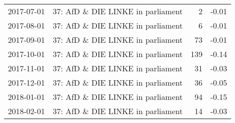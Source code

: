 \begin{table}[ht]
\begin{tabular}{llrr}
  2017-07-01 & 37: AfD \& DIE LINKE in parliament &   2 & -0.01 \\ 
  2017-08-01 & 37: AfD \& DIE LINKE in parliament &   6 & -0.01 \\ 
  2017-09-01 & 37: AfD \& DIE LINKE in parliament &  73 & -0.01 \\ 
  2017-10-01 & 37: AfD \& DIE LINKE in parliament & 139 & -0.14 \\ 
  2017-11-01 & 37: AfD \& DIE LINKE in parliament &  31 & -0.03 \\ 
  2017-12-01 & 37: AfD \& DIE LINKE in parliament &  36 & -0.05 \\ 
  2018-01-01 & 37: AfD \& DIE LINKE in parliament &  94 & -0.15 \\ 
  2018-02-01 & 37: AfD \& DIE LINKE in parliament &  14 & -0.03 \\ 
   \hline
\end{tabular}
\end{table}
